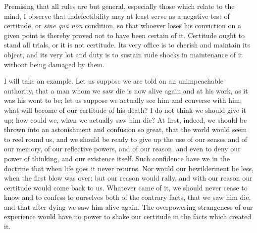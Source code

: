Premising that all rules are but general, especially those which
relate to the mind, I observe that indefectibility may at least serve
as a negative test of certitude, or \emph{sine quâ non} condition, so
that whoever loses his conviction on a given point is thereby proved
not to have been certain of it. Certitude ought to stand all trials,
or it is not certitude. Its very office is to cherish and maintain its
object, and its very lot and duty is to sustain rude shocks in
maintenance of it without being damaged by them.

I will take an example. Let us suppose we are told on an
unimpeachable authority, that a man whom we saw die is now alive again
and at his work, as it was his wont to be; let us suppose we actually
see him and converse with him; what will become of our certitude of
his death? I do not think we should give it up; how could we, when we
actually saw him die? At first, indeed, we should be thrown into an
astonishment and confusion so great, that the world would seem to reel
round us, and we should be ready to give up the use of our senses and
of our memory, of our reflective powers, and of our reason, and even
to deny our power of thinking, and our existence itself. Such
confidence have we in the doctrine that when life goes it never
returns. Nor would our bewilderment be less, when the first blow was
over; but our reason would rally, and with our reason our certitude
would come back to us. Whatever came of it, we should never cease to
know and to confess to ourselves both of the contrary facts, that we
saw him die, and that after dying we saw him alive again. The
overpowering strangeness of our experience would have no power
to shake our certitude in the facts which created it.

